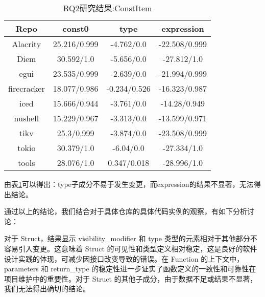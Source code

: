\begin{table}[ht]
	\centering
        \caption{RQ2研究结果:ConstItem}
	\begin{tabular}{cccc}
        \toprule
		\textbf{Repo}        & \textbf{const0}       & \textbf{type}         & \textbf{expression}    \\
        \midrule
		Alacrity    & \cellcolor{gray!20}25.216/0.999 & \cellcolor{orange!30}-4.762/0.0   & \cellcolor{gray!20}-22.508/0.999 \\
		Diem        & \cellcolor{gray!20}30.592/1.0   & \cellcolor{orange!30}-5.656/0.0   & \cellcolor{gray!20}-27.812/1.0   \\
		egui        & \cellcolor{gray!20}23.535/0.999 & \cellcolor{orange!30}-2.639/0.0   & \cellcolor{gray!20}-21.994/0.999 \\
		firecracker & \cellcolor{gray!20}18.077/0.986 & \cellcolor{gray!20}-0.234/0.526 & \cellcolor{gray!20}-16.323/0.987 \\
		iced        & \cellcolor{gray!20}15.666/0.944 & \cellcolor{orange!30}-3.761/0.0   & \cellcolor{gray!20}-14.28/0.949  \\
		nushell     & \cellcolor{gray!20}15.229/0.967 & \cellcolor{orange!30}-3.313/0.0   & \cellcolor{gray!20}-13.599/0.971 \\
		tikv        & \cellcolor{gray!20}25.3/0.999   & \cellcolor{orange!30}-3.874/0.0   & \cellcolor{gray!20}-23.508/0.999 \\
		tokio       & \cellcolor{gray!20}30.379/1.0   & \cellcolor{orange!30}-6.04/0.0    & \cellcolor{gray!20}-27.334/1.0   \\
		tools       & \cellcolor{gray!20}28.076/1.0   & \cellcolor{green!30}0.347/0.018  & \cellcolor{gray!20}-28.996/1.0   \\
        \bottomrule  
	\end{tabular}
	\label{tab:RQ2-4}
\end{table}

由表\ref{tab:RQ2-4}可以得出：type子成分不易于发生变更，而expression的结果不显著，无法得出结论。

通过以上的结论，我们结合对于具体仓库的具体代码实例的观察，有如下分析讨论：

对于 Struct，结果显示 visibility\_modifier 和 type 类型的元素相对于其他部分不容易引入变更。这意味着 Struct 的可见性和类型定义相对稳定，这是良好的软件设计实践的体现，可减少因接口改变导致的错误。在 Function 的上下文中，parameters 和 return\_type 的稳定性进一步证实了函数定义的一致性和可靠性在项目维护中的重要性。对于 Struct 的其他子成分，由于数据不足或结果不显著，我们无法得出确切的结论。

